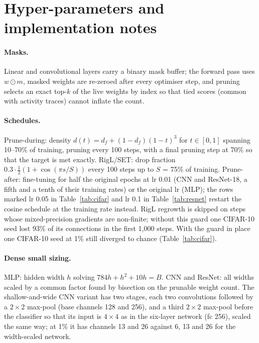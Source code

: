 \documentclass[11pt]{article}
\begin{document}



\appendix

\section{Hyper-parameters and implementation notes}
\label{app:hparams}

\paragraph{Masks.} Linear and convolutional layers carry a binary mask buffer; the forward pass uses $w \odot m$, masked
weights are re-zeroed after every optimiser step, and pruning selects an exact top-$k$ of the live weights by index so that
tied scores (common with activity traces) cannot inflate the count.

\paragraph{Schedules.} Prune-during: density $d(t)=d_f+(1-d_f)(1-t)^3$ for $t\in[0,1]$ spanning 10--70\% of training, pruning
every 100 steps, with a final pruning step at 70\% so that the target is met exactly. RigL/SET: drop fraction
$0.3\cdot\frac{1}{2}(1+\cos(\pi s/S))$ every 100 steps up to $S$ = 75\% of training. Prune-after: fine-tuning for half the
original epochs at lr 0.01 (CNN and ResNet-18, a fifth and a tenth of their training rates) or the original lr (MLP); the rows marked lr 0.05 in Table~\ref{tab:cifar} and lr 0.1 in
Table~\ref{tab:resnet} restart the cosine schedule at the training rate instead. RigL regrowth is skipped on steps whose mixed-precision gradients
are non-finite; without this guard one CIFAR-10 seed lost 93\% of its connections in the first 1{,}000 steps. With the guard
in place one CIFAR-10 seed at 1\% still diverged to chance (Table~\ref{tab:cifar}).

\paragraph{Dense small sizing.} MLP: hidden width $h$ solving $784h+h^2+10h=B$. CNN and ResNet: all widths scaled by a common
factor found by bisection on the prunable weight count. The shallow-and-wide CNN variant has two stages, each two convolutions followed by a
$2\times2$ max-pool (base channels 128 and 256), and a third $2\times2$ max-pool before the classifier so that its input is
$4\times4$ as in the six-layer network (fc 256), scaled the same way; at 1\% it has channels 13 and 26 against 6, 13 and
26 for the width-scaled network.
\end{document}

